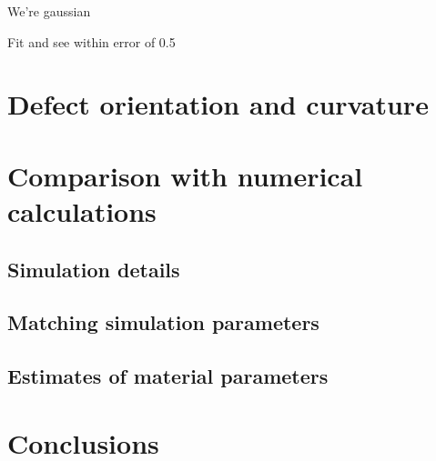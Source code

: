 We're gaussian

Fit and see within error of 0.5



\section{Defect orientation and curvature}

\section{Comparison with numerical calculations}
\subsection{Simulation details}
\subsection{Matching simulation parameters}
\subsection{Estimates of material parameters}

\section{Conclusions}

